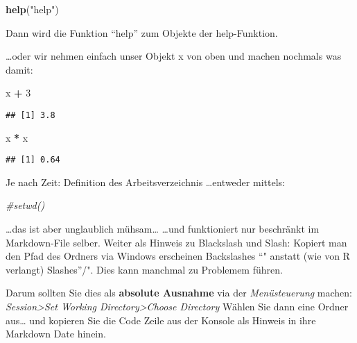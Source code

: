 \documentclass[
]{book}
\newenvironment{Shaded}{\begin{snugshade}}{\end{snugshade}}
\newcommand{\CommentTok}[1]{\textcolor[rgb]{0.56,0.35,0.01}{\textit{#1}}}
\newcommand{\DecValTok}[1]{\textcolor[rgb]{0.00,0.00,0.81}{#1}}
\newcommand{\KeywordTok}[1]{\textcolor[rgb]{0.13,0.29,0.53}{\textbf{#1}}}
\newcommand{\NormalTok}[1]{#1}
\newcommand{\OperatorTok}[1]{\textcolor[rgb]{0.81,0.36,0.00}{\textbf{#1}}}
\newcommand{\StringTok}[1]{\textcolor[rgb]{0.31,0.60,0.02}{#1}}
\begin{document}
\begin{Shaded}
\begin{Highlighting}[]
\KeywordTok{help}\NormalTok{(}\StringTok{"help"}\NormalTok{)}
\end{Highlighting}
\end{Shaded}

Dann wird die Funktion ``help'' zum Objekte der help-Funktion.

\ldots oder wir nehmen einfach unser Objekt x von oben und machen nochmals was damit:

\begin{Shaded}
\begin{Highlighting}[]
\NormalTok{x }\OperatorTok{+}\StringTok{ }\DecValTok{3}
\end{Highlighting}
\end{Shaded}

\begin{verbatim}
## [1] 3.8
\end{verbatim}

\begin{Shaded}
\begin{Highlighting}[]
\NormalTok{x }\OperatorTok{*}\StringTok{ }\NormalTok{x}
\end{Highlighting}
\end{Shaded}

\begin{verbatim}
## [1] 0.64
\end{verbatim}

Je nach Zeit: Definition des Arbeitsverzeichnis
\ldots entweder mittels:

\begin{Shaded}
\begin{Highlighting}[]
\CommentTok{#setwd()}
\end{Highlighting}
\end{Shaded}

\ldots das ist aber unglaublich mühsam\ldots{}
\ldots und funktioniert nur beschränkt im Markdown-File selber.
Weiter als Hinweis zu Blackslash und Slash:
Kopiert man den Pfad des Ordners via Windows erscheinen Backslashes ``" anstatt (wie von R verlangt)
Slashes''/". Dies kann manchmal zu Problemem führen.

Darum sollten Sie dies als \textbf{absolute Ausnahme} via der \emph{Menüsteuerung} machen:
\emph{Session\textgreater Set Working Directory\textgreater Choose Directory}
Wählen Sie dann eine Ordner aus\ldots{} und kopieren Sie die Code Zeile aus der Konsole als Hinweis in ihre Markdown Date hinein.
\end{document}
